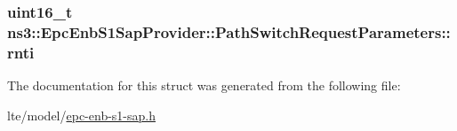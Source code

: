 \subsubsection[{\texorpdfstring{rnti}{rnti}}]{\setlength{\rightskip}{0pt plus 5cm}uint16\+\_\+t ns3\+::\+Epc\+Enb\+S1\+Sap\+Provider\+::\+Path\+Switch\+Request\+Parameters\+::rnti}\hypertarget{structns3_1_1EpcEnbS1SapProvider_1_1PathSwitchRequestParameters_af3d5af75bafaaa38ea23e76cff63ab11}{}\label{structns3_1_1EpcEnbS1SapProvider_1_1PathSwitchRequestParameters_af3d5af75bafaaa38ea23e76cff63ab11}


The documentation for this struct was generated from the following file\+:\begin{DoxyCompactItemize}
\item 
lte/model/\hyperlink{epc-enb-s1-sap_8h}{epc-\/enb-\/s1-\/sap.\+h}\end{DoxyCompactItemize}
